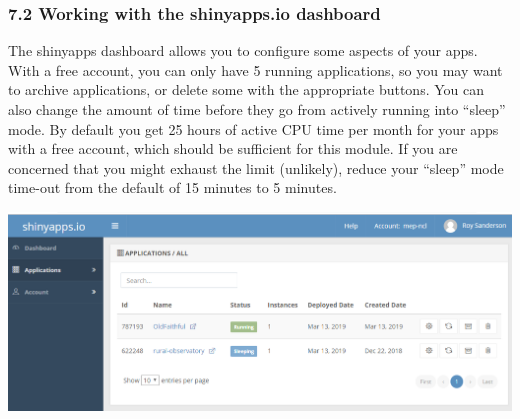 \documentclass[]{article}
\begin{document}
\subsubsection{7.2 Working with the shinyapps.io
dashboard}\label{working-with-the-shinyapps.io-dashboard}

The shinyapps dashboard allows you to configure some aspects of your
apps. With a free account, you can only have 5 running applications, so
you may want to archive applications, or delete some with the
appropriate buttons. You can also change the amount of time before they
go from actively running into ``sleep'' mode. By default you get 25
hours of active CPU time per month for your apps with a free account,
which should be sufficient for this module. If you are concerned that
you might exhaust the limit (unlikely), reduce your ``sleep'' mode
time-out from the default of 15 minutes to 5 minutes.

\includegraphics[width=0.5\linewidth]{figs/shinyapp_dashboard}
\end{document}
